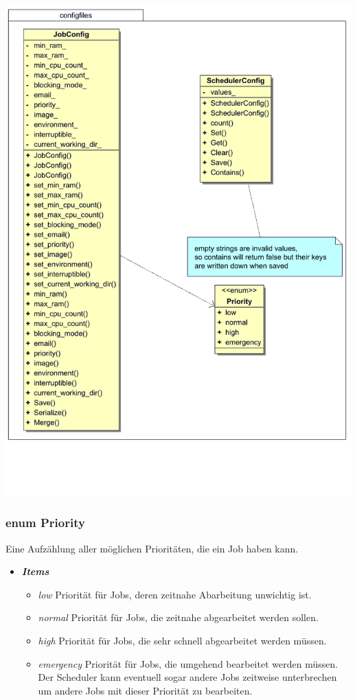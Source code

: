 \documentclass[a4paper,12pt]{article}
\begin{document}
\includegraphics[width=\textwidth]{configfiles}

\subsubsection{enum Priority}

Eine Aufzählung aller möglichen Prioritäten, die ein Job haben kann.
\begin{itemize}[label={}]
	\item \textit{\textbf{Items}}
		\begin{itemize}[label={\textbullet}]
			\item \textit{low} Priorität für Jobs, deren zeitnahe Abarbeitung unwichtig ist.
			\item \textit{normal} Priorität für Jobs, die zeitnahe abgearbeitet werden sollen.
			\item \textit{high} Priorität für Jobs, die sehr schnell abgearbeitet werden müssen.
			\item \textit{emergency} Priorität für Jobs, die umgehend bearbeitet werden müssen. Der Scheduler kann eventuell sogar andere Jobs zeitweise unterbrechen um andere Jobs mit dieser Priorität zu bearbeiten.
		\end{itemize}
\end{itemize}
\end{document}
